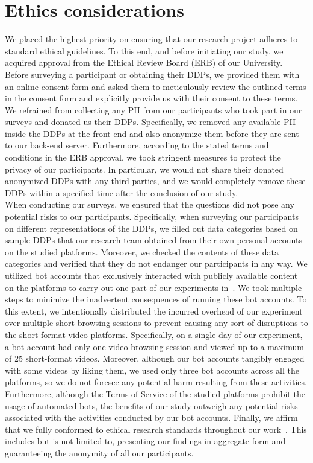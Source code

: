 \section{Ethics considerations}
\label{sec:ethics}
\vspace*{-9pt}
We placed the highest priority on ensuring that our research project adheres to standard ethical guidelines.
To this end, and before initiating our study, we acquired approval from the Ethical Review Board (ERB) of our University.
Before surveying a participant or obtaining their DDPs, we provided them with an online consent form and asked them to meticulously review the outlined terms in the consent form and explicitly provide us with their consent to these terms.
We refrained from collecting any PII from our participants who took part in our surveys and donated us their DDPs.
Specifically, we removed any available PII inside the DDPs at the front-end and also anonymize them before they are sent to our back-end server.
Furthermore, according to the stated terms and conditions in the ERB approval, we took stringent measures to protect the privacy of our participants.
In particular, we would not share their donated anonymized DDPs with any third parties, and we would completely remove these DDPs within a specified time after the conclusion of our study.\\
When conducting our surveys, we ensured that the questions did not pose any potential risks to our participants.
Specifically, when surveying our participants on different representations of the DDPs, we filled out data categories based on sample DDPs that our research team obtained from their own personal accounts on the studied platforms.
Moreover, we checked the contents of these data categories and verified that they do not endanger our participants in any way. We utilized bot accounts that exclusively interacted with publicly available content on the platforms to carry out one part of our experiments in~.
We took multiple steps to minimize the inadvertent consequences of running these bot accounts.
To this extent, we intentionally distributed the incurred overhead of our experiment over multiple short browsing sessions to prevent causing any sort of disruptions to the short-format video platforms.
Specifically, on a single day of our experiment, a bot account had only one video browsing session and viewed up to a maximum of 25 short-format videos.
Moreover, although our bot accounts tangibly engaged with some videos by liking them, we used only three bot accounts across all the platforms, so we do not foresee any potential harm resulting from these activities.
Furthermore, although the Terms of Service of the studied platforms prohibit the usage of automated bots, the benefits of our study outweigh any potential risks associated with the activities conducted by our bot accounts. Finally, we affirm that we fully conformed to ethical research standards throughout our work~\cite{rivers2014ethical}.
This includes but is not limited to, presenting our findings in aggregate form and guaranteeing the anonymity of all our participants.
